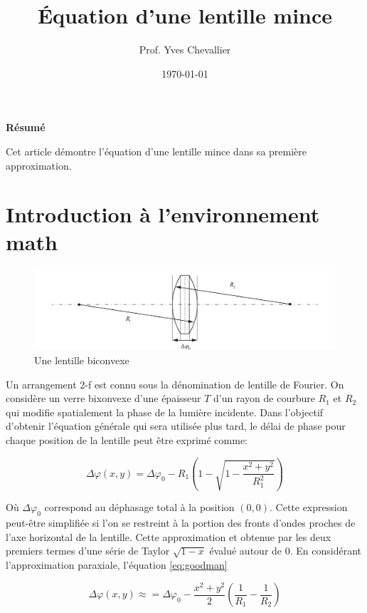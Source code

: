 \documentclass[a4paper]{article}
\title{Équation d'une lentille mince}
\author{Prof. Yves Chevallier}
\date{\today}
\begin{document}
\maketitle
\begin{center}
    \textbf{Résumé}\par
\end{center}
    Cet article démontre l'équation d'une lentille mince dans sa première approximation.

\section{Introduction à l'environnement math}

\begin{figure}[h]
    \centering
    \includegraphics[width=\textwidth]{tlens.pdf}
    \caption{Une lentille biconvexe}
\end{figure}

Un arrangement 2-f est connu sous la dénomination de lentille de Fourier. On considère un verre bixonvexe d'une épaisseur $T$ d'un rayon de courbure $R_1$ et $R_2$ qui modifie spatialement la phase de la lumière incidente. Dans l'objectif d'obtenir l'équation générale \cite{goodman} qui sera utilisée plus tard, le délai de phase pour chaque position de la lentille peut être exprimé comme: 

\begin{equation}
    \Delta\varphi(x,y)=\Delta\varphi_0-R_1\left(1-\sqrt{1-\frac{x^2+y^2}{R_1^2}}\right)
    \label{eq:goodman}
\end{equation}

Où $\Delta\varphi_0$ correspond au déphasage total à la position $(0,0)$. Cette expression peut-être simplifiée si l'on se restreint à la portion des fronts d'ondes proches de l'axe horizontal de la lentille. Cette approximation et obtenue par les deux premiers termes d'une série de Taylor $\sqrt{1-x}$ évalué autour de $0$. En considérant l'approximation paraxiale, l'équation \ref{eq:goodman}

\begin{equation}
\Delta\varphi(x,y)\approx=\Delta\varphi_0-\frac{x^2+y^2}{2}\left(\frac{1}{R_1}-\frac{1}{R_2}\right)
\label{eq:toto}
\end{equation}
\end{document}
